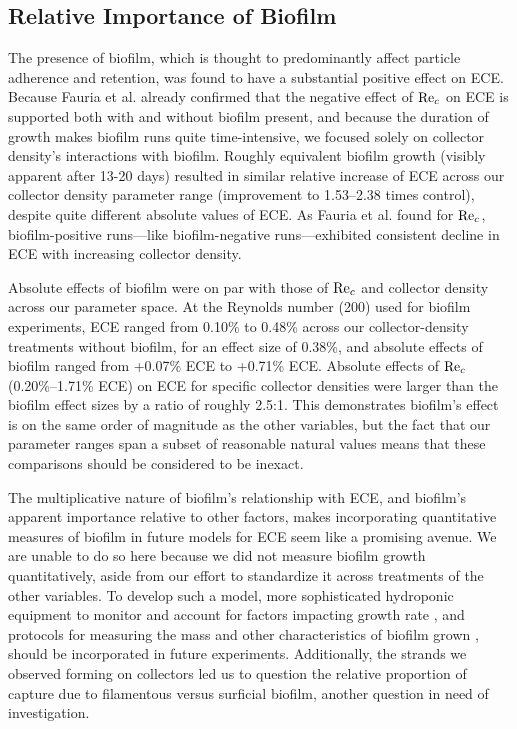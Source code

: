 \documentclass[geosciences,article,submit,moreauthors,pdftex]{Definitions/mdpi}
\begin{document}
\subsection{Relative Importance of Biofilm}

The presence of biofilm, which is thought to predominantly affect particle adherence and retention, was found to have a substantial positive effect on ECE. Because Fauria et al. \cite{Fauria_2015} already confirmed that the negative effect of $\mathrm{Re}_c$ on ECE is supported both with and without biofilm present, and because the duration of growth makes biofilm runs quite time-intensive, we focused solely on collector density's interactions with biofilm. Roughly equivalent biofilm growth (visibly apparent after 13-20 days) resulted in similar relative increase of ECE across our collector density parameter range (improvement to 1.53--2.38 times control), despite quite different absolute values of ECE. As Fauria et al. \cite{Fauria_2015} found for $\mathrm{Re}_c$, biofilm-positive runs---like biofilm-negative runs---exhibited consistent decline in ECE with increasing collector density.

Absolute effects of biofilm were on par with those of $\mathrm{Re}_c$ and collector density across our parameter space. At the Reynolds number (200) used for biofilm experiments, ECE ranged from 0.10\% to 0.48\% across our collector-density treatments without biofilm, for an effect size of 0.38\%, and absolute effects of biofilm ranged from +0.07\% ECE to +0.71\% ECE. Absolute effects of $\mathrm{Re}_c$ (0.20\%--1.71\% ECE) on ECE for specific collector densities were larger than the biofilm effect sizes by a ratio of roughly 2.5:1. This demonstrates biofilm's effect is on the same order of magnitude as the other variables, but the fact that our parameter ranges span a subset of reasonable natural values means that these comparisons should be considered to be inexact.

The multiplicative nature of biofilm's relationship with ECE, and biofilm's apparent importance relative to other factors, makes incorporating quantitative measures of biofilm in future models for ECE seem like a promising avenue. We are unable to do so here because we did not measure biofilm growth quantitatively, aside from our effort to standardize it across treatments of the other variables. To develop such a model, more sophisticated hydroponic equipment to monitor and account for factors impacting growth rate \cite{schnurr2014effect, trulear1982dynamics}, and protocols for measuring the mass and other characteristics of biofilm grown \cite{liu1994simple,characklis1982dynamics}, should be incorporated in future experiments. Additionally, the strands we observed forming on collectors led us to question the relative proportion of capture due to filamentous versus surficial biofilm, another question in need of investigation.
\end{document}

